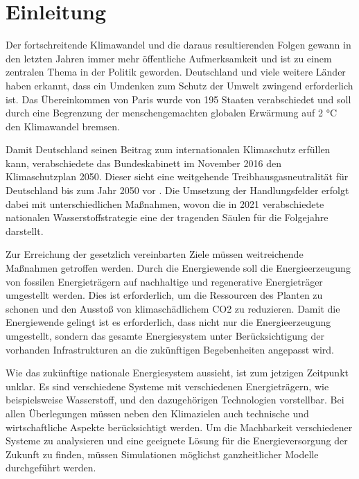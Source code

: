 \section{Einleitung}
Der fortschreitende Klimawandel und die daraus resultierenden Folgen gewann in den letzten Jahren immer mehr öffentliche Aufmerksamkeit und ist zu einem zentralen Thema in der Politik geworden. Deutschland und viele weitere Länder haben erkannt, dass ein Umdenken zum Schutz der Umwelt zwingend erforderlich ist. Das Übereinkommen von Paris wurde von 195 Staaten verabschiedet und soll durch eine Begrenzung der menschengemachten globalen Erwärmung auf 2 °C den Klimawandel bremsen. 

Damit Deutschland seinen Beitrag zum internationalen Klimaschutz erfüllen kann, verabschiedete das Bundeskabinett im November 2016 den Klimaschutzplan 2050. Dieser sieht eine weitgehende Treibhausgasneutralität für Deutschland bis zum Jahr 2050 vor . 
Die Umsetzung der Handlungsfelder erfolgt dabei mit unterschiedlichen Maßnahmen, wovon die in 2021 verabschiedete nationalen Wasserstoffstrategie eine der tragenden Säulen für die Folgejahre darstellt.  

Zur Erreichung der gesetzlich vereinbarten Ziele müssen weitreichende Maßnahmen getroffen werden.
Durch die Energiewende soll die Energieerzeugung von fossilen Energieträgern auf nachhaltige und regenerative Energieträger umgestellt werden.  Dies ist erforderlich, um die Ressourcen des Planten zu schonen und den Ausstoß von klimaschädlichem CO2 zu reduzieren. Damit die Energiewende gelingt ist es erforderlich, dass nicht nur die Energieerzeugung umgestellt, sondern das gesamte Energiesystem unter Berücksichtigung der vorhanden Infrastrukturen an die zukünftigen Begebenheiten angepasst wird.

Wie das zukünftige nationale Energiesystem aussieht, ist zum jetzigen Zeitpunkt unklar. Es sind verschiedene Systeme mit verschiedenen Energieträgern, wie beispielsweise Wasserstoff, und den dazugehörigen Technologien vorstellbar. 
Bei allen Überlegungen müssen neben den Klimazielen auch technische und wirtschaftliche Aspekte berücksichtigt werden. 
Um die Machbarkeit verschiedener Systeme zu analysieren und eine geeignete Lösung für die Energieversorgung der Zukunft zu finden, müssen Simulationen möglichst ganzheitlicher Modelle durchgeführt werden.

